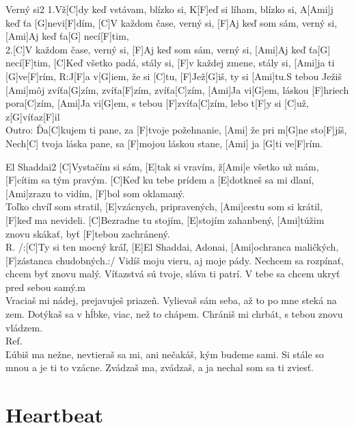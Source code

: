 \documentclass[12pt]{article}
\begin{document}
\begin{song}{Verný si}{2}
	1.Vž[C]dy keď vstávam, blízko si,
	K[F]eď si líham, blízko si,
	A[Ami]j keď ťa [G]nevi[F]dím,
	[C]V každom čase, verný si,
	[F]Aj keď som sám, verný si,
	[Ami]Aj keď ťa[G] necí[F]tim,
	\\
	2.[C]V každom čase, verný si,
	[F]Aj keď som sám, verný si,
	[Ami]Aj keď ťa[G] necí[F]tim,
	[C]Keď všetko padá, stály si,
	[F]v každej zmene, stály si,
	[Ami]ja ti [G]ve[F]rím,
	\columnbreak
	R:J[F]a v[G]iem, že si [C]tu,
	[F]Jež[G]iš, ty si [Ami]tu.S tebou Ježiš [Ami]môj
	zvíťa[G]zím, zvíťa[F]zím, zvíťa[C]zím,
	[Ami]Ja vi[G]em, láskou [F]hriech pora[C]zím,
	[Ami]Ja vi[G]em, s tebou [F]zvíťa[C]zím,
	lebo t[F]y si [C]už, z[G]víťaz[F]il
	\\
	Outro:
	Ďa[C]kujem ti pane, 
	za [F]tvoje požehnanie, 
	[Ami] že pri m[G]ne sto[F]jíš,
	Nech[C] tvoja láska pane, 
	sa [F]mojou láskou stane,
	[Ami] ja [G]ti ve[F]rím.
\end{song}

\begin{song}{El Shaddai}{2}
	[C]Vystačím si sám, [E]tak si vravím,
	ž[Ami]e všetko už mám, [F]cítim sa tým pravým.
	[C]Keď ku tebe prídem a [E]dotkneš sa mi dlaní,
	[Ami]zrazu to vidím, [F]bol som oklamaný.
	\\
	[C]Toľko chvíľ som stratil, 
	[E]vzácnych, pripravených,
	[Ami]cestu som si krátil, [F]keď ma nevideli.
	[C]Bezradne tu stojím, [E]stojím zahanbený,
	[Ami]túžim znovu skákať, byť [F]tebou zachránený.
	\\
	R. /:[C]Ty si ten mocný kráľ,
	[E]El Shaddai, Adonai,
	[Ami]ochranca maličkých,
	[F]zástanca chudobných.:/
	\columnbreak
	Vidíš moju vieru, aj moje pády.
	Nechcem sa rozpínať, 
	chcem byť znovu malý.
	Víťazstvá sú tvoje, sláva ti patrí.
	V tebe sa chcem ukryť pred sebou samý.m
	\\
	Vraciaš mi nádej, prejavuješ priazeň.
	Vylievaš sám seba, 
	až to po mne steká na zem.
	Dotýkaš sa v hĺbke, viac, než to chápem.
	Chrániš mi chrbát, s tebou znovu vládzem.
	\\
	Ref.
	\\
	Ľúbiš ma nežne, nevtieraš sa mi,
	ani nečakáš, kým budeme sami.
	Si stále so mnou a je ti to vzácne.
	Zvádzaš ma, zvádzaš,
	a ja nechal som sa ti zviesť.
\end{song}

\newpage

\section{Heartbeat}
\end{document}
